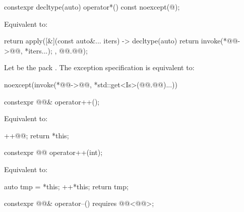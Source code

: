 %
\begin{itemdecl}
constexpr decltype(auto) operator*() const noexcept(@\seebelow@);
\end{itemdecl}

\begin{itemdescr}
\pnum
\effects
Equivalent to:
\begin{codeblock}
return apply([&](const auto&... iters) -> decltype(auto) {
  return invoke(*@@->@@, *iters...);
}, @@.@@);
\end{codeblock}

\pnum
\remarks
Let  be the pack .
The exception specification is equivalent to:
\begin{codeblock}
noexcept(invoke(*@@->@@, *std::get<Is>(@@.@@)...))
\end{codeblock}
\end{itemdescr}

%
\begin{itemdecl}
constexpr @@& operator++();
\end{itemdecl}

\begin{itemdescr}
\pnum
\effects
Equivalent to:
\begin{codeblock}
++@@;
return *this;
\end{codeblock}
\end{itemdescr}

%
\begin{itemdecl}
constexpr @@ operator++(int);
\end{itemdecl}

\begin{itemdescr}
\pnum
\effects
Equivalent to:
\begin{codeblock}
auto tmp = *this;
++*this;
return tmp;
\end{codeblock}
\end{itemdescr}

%
\begin{itemdecl}
constexpr @@& operator--() requires @@<@@>;
\end{itemdecl}

